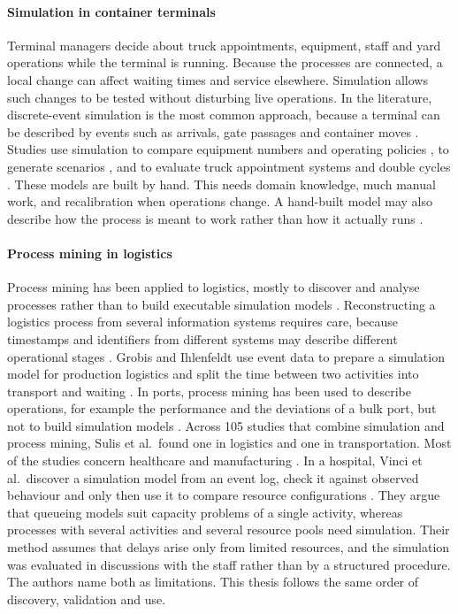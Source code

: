 \paragraph{Simulation in container terminals}
Terminal managers decide about truck appointments, equipment, staff and yard
operations while the terminal is running. Because the processes are
connected, a local change can affect waiting times and service elsewhere.
Simulation allows such changes to be tested without disturbing live
operations. In the literature, discrete-event simulation is the most common
approach, because a terminal can be described by events such as arrivals, gate
passages and container moves \cite{Carboni2025}. Studies
use simulation to compare equipment numbers and operating policies
\cite{Kastner2021}, to generate scenarios \cite{Hartmann2005cenariosforCTSimulation},
and to evaluate truck appointment systems and double cycles
\cite{CTprocessMiningTAS2020,Bett2024}. These models are built by hand. This
needs domain knowledge, much manual work, and recalibration when operations
change. A hand-built model may also describe how the process is meant to work
rather than how it actually runs \cite{PMRozinat2009}.

\paragraph{Process mining in logistics}
Process mining has been applied to logistics, mostly to discover and analyse
processes rather than to build executable simulation models
\cite{RWAlnahas2023Logistics}. Reconstructing a logistics process from several
information systems requires care, because timestamps and identifiers from
different systems may describe different operational stages
\cite{RWBecker2017Context}. Grobis and Ihlenfeldt use event data to prepare a
simulation model for production logistics and split the time between two
activities into transport and waiting \cite{Grobis2025ProductionLogistics}. In
ports, process mining has been used to describe operations, for example the
performance and the deviations of a bulk port, but not to build simulation
models \cite{Wang2014BulkPort}. Across 105 studies that combine simulation and
process mining, Sulis et al.\ found one in logistics and one in transportation.
Most of the studies concern healthcare and manufacturing
\cite{Sulis2026SimulationReview}. In a hospital, Vinci et al.\ discover a
simulation model from an event log, check it against observed behaviour and only
then use it to compare resource configurations \cite{Hospital2026Vinci}. They argue
that queueing models suit capacity problems of a single activity, whereas processes
with several activities and several resource pools need simulation. Their method
assumes that delays arise only from limited resources, and the simulation was
evaluated in discussions with the staff rather than by a structured procedure. The
authors name both as limitations. This thesis follows the same order of discovery,
validation and use.

